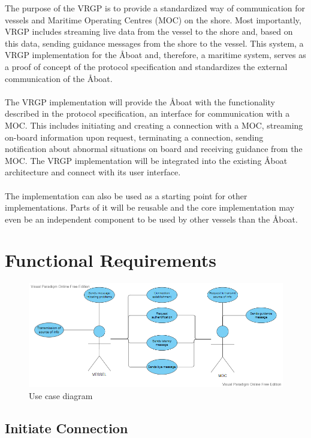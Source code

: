 The purpose of the VRGP is to provide a standardized way of communication for vessels and Maritime Operating Centres (MOC) on the shore. Most importantly, VRGP includes streaming live data from the vessel to the shore and, based on this data, sending guidance messages from the shore to the vessel. This system, a VRGP implementation for the Åboat and, therefore, a maritime system, serves as a proof of concept of the protocol specification and standardizes the external communication of the Åboat.
\\\\
The VRGP implementation will provide the Åboat with the functionality described in the protocol specification, an interface for communication with a MOC. This includes initiating and creating a connection with a MOC, streaming on-board information upon request, terminating a connection, sending notification about abnormal situations on board and receiving guidance from the MOC. The VRGP implementation will be integrated into the existing Åboat architecture and connect with its user interface.
\\\\
The implementation can also be used as a starting point for other implementations. Parts of it will be reusable and the core implementation may even be an independent component to be used by other vessels than the Åboat.

\section{Functional Requirements}\label{sec:func-requirements}

\begin{figure}[ht]
	\centering
	\includegraphics[width=\linewidth]{diagrams/use-case-diagram}
	\caption{Use case diagram}
	\label{fig:use-case-diagram}
\end{figure}

\subsection{Initiate Connection}

